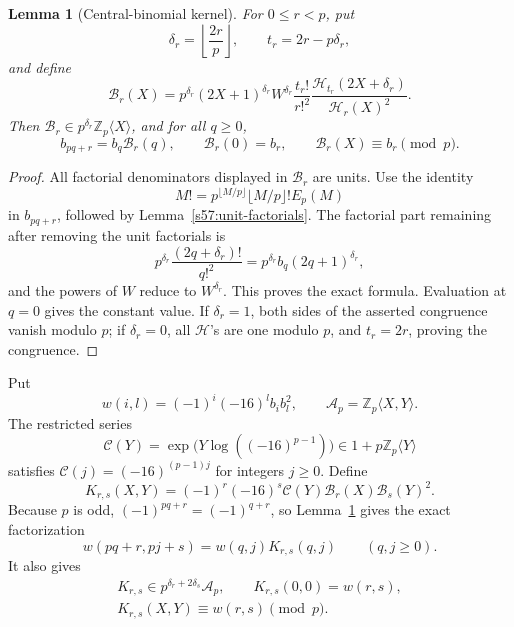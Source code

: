 \documentclass[11pt,a4paper]{article}
\numberwithin{equation}{section}
\newtheorem{lemma}[theorem]{Lemma}
\theoremstyle{remark}
\begin{document}
\begin{lemma}[Central-binomial kernel]
\label{s57:central-kernel}
For \(0\le r<p\), put
\[
 \delta_r=\left\lfloor\frac{2r}{p}\right\rfloor,
 \qquad t_r=2r-p\delta_r,
\]
and define
\[
 \mathcal B_r(X)=
 p^{\delta_r}(2X+1)^{\delta_r}W^{\delta_r}
 \frac{t_r!}{r!^2}
 \frac{\mathcal H_{t_r}(2X+\delta_r)}{\mathcal H_r(X)^2}.
\]
Then \(\mathcal B_r\in p^{\delta_r}\mathbb Z_p\langle X\rangle\),
and for all \(q\ge0\),
\[
 b_{pq+r}=b_q\mathcal B_r(q),\qquad
 \mathcal B_r(0)=b_r,\qquad
 \mathcal B_r(X)\equiv b_r\pmod p.
\]
\end{lemma}
\begin{proof}
All factorial denominators displayed in \(\mathcal B_r\) are units.
Use the identity
\[
 M!=p^{\lfloor M/p\rfloor}\lfloor M/p\rfloor!E_p(M)
\]
in \(b_{pq+r}\), followed by Lemma~\ref{s57:unit-factorials}.
The factorial part remaining after removing the unit factorials is
\[
 p^{\delta_r}\frac{(2q+\delta_r)!}{q!^2}
       =p^{\delta_r}b_q(2q+1)^{\delta_r},
\]
and the powers of \(W\) reduce to \(W^{\delta_r}\). This proves the
exact formula. Evaluation at \(q=0\) gives the constant value.
If \(\delta_r=1\), both sides of the asserted congruence vanish
modulo \(p\); if \(\delta_r=0\), all \(\mathcal H\)'s are one
modulo \(p\), and \(t_r=2r\), proving the congruence.
\end{proof}

Put
\[
 w(i,l)=(-1)^i(-16)^l b_i b_l^2,
 \qquad \mathcal A_p=\mathbb Z_p\langle X,Y\rangle.
\]
The restricted series
\[
 \mathcal C(Y)=\exp\bigl(Y\log((-16)^{p-1})\bigr)
                    \in1+p\mathbb Z_p\langle Y\rangle
\]
satisfies \(\mathcal C(j)=(-16)^{(p-1)j}\) for integers \(j\ge0\).
Define
\begin{equation}
 K_{r,s}(X,Y)=(-1)^r(-16)^s\mathcal C(Y)
                  \mathcal B_r(X)\mathcal B_s(Y)^2.
 \label{s57:two-variable-kernel}
\end{equation}
Because \(p\) is odd, \((-1)^{pq+r}=(-1)^{q+r}\), so
Lemma~\ref{s57:central-kernel} gives the exact factorization
\begin{equation}
 w(pq+r,pj+s)=w(q,j)K_{r,s}(q,j)\qquad(q,j\ge0).
 \label{s57:exact-kernel}
\end{equation}
It also gives
\begin{equation}
 \begin{gathered}
 K_{r,s}\in p^{\delta_r+2\delta_s}\mathcal A_p,
 \qquad K_{r,s}(0,0)=w(r,s),\\
 K_{r,s}(X,Y)\equiv w(r,s)\pmod p.
 \end{gathered}
 \label{s57:kernel-properties}
\end{equation}
\end{document}
